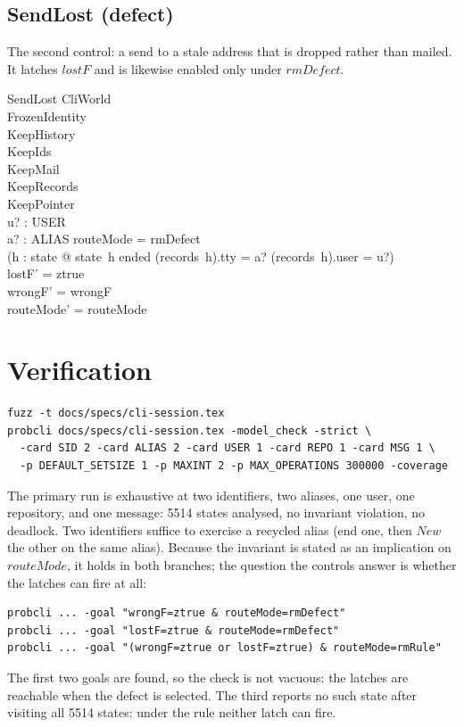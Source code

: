 \documentclass[a4paper,10pt,fleqn]{article}
\begin{document}
\subsection{SendLost (defect)}

The second control: a send to a stale address that is dropped rather
than mailed.  It latches $lostF$ and is likewise enabled only under
$rmDefect$.

\begin{schema}{SendLost}
  \Delta CliWorld \\
  FrozenIdentity \\
  KeepHistory \\
  KeepIds \\
  KeepMail \\
  KeepRecords \\
  KeepPointer \\
  u? : USER \\
  a? : ALIAS
  \where
  routeMode = rmDefect \\
  \lnot (\exists h : \dom state @
    state~h \neq ended
      \land (records~h).tty = a?
      \land (records~h).user = u?) \\
  lostF' = ztrue \\
  wrongF' = wrongF \\
  routeMode' = routeMode
\end{schema}

\section{Verification}

\begin{verbatim}
fuzz -t docs/specs/cli-session.tex
probcli docs/specs/cli-session.tex -model_check -strict \
  -card SID 2 -card ALIAS 2 -card USER 1 -card REPO 1 -card MSG 1 \
  -p DEFAULT_SETSIZE 1 -p MAXINT 2 -p MAX_OPERATIONS 300000 -coverage
\end{verbatim}

The primary run is exhaustive at two identifiers, two aliases, one user,
one repository, and one message: 5514 states analysed, no invariant
violation, no deadlock.  Two identifiers suffice to exercise a recycled alias (end one,
then $New$ the other on the same alias).  Because the invariant is
stated as an implication on $routeMode$, it holds in both branches; the
question the controls answer is whether the latches can fire at all:

\begin{verbatim}
probcli ... -goal "wrongF=ztrue & routeMode=rmDefect"
probcli ... -goal "lostF=ztrue & routeMode=rmDefect"
probcli ... -goal "(wrongF=ztrue or lostF=ztrue) & routeMode=rmRule"
\end{verbatim}

The first two goals are found, so the check is not vacuous: the latches
are reachable when the defect is selected.  The third reports no such
state after visiting all 5514 states: under the rule neither latch can
fire.
\end{document}
